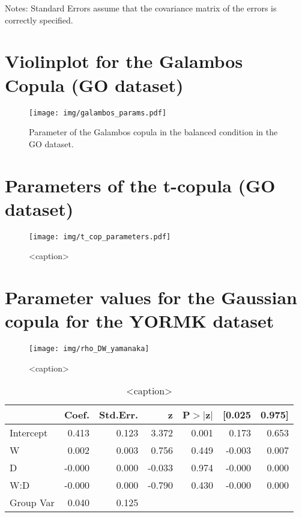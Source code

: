 \documentclass{article}
\begin{document}
Notes: \newline
[1] Standard Errors assume that the covariance matrix of the errors is correctly specified.


\section{Violinplot for the Galambos Copula (GO dataset)}
\begin{figure}[htbp]
    \centering
    \texttt{[image: img/galambos\_params.pdf]}
    \caption{Parameter of the Galambos copula in the balanced condition in the GO dataset.}
    \label{<label>}
\end{figure}

\section{Parameters of the t-copula (GO dataset)}
\begin{figure}[htbp]
    \centering
    \texttt{[image: img/t\_cop\_parameters.pdf]}
    \caption{<caption>}
    \label{<label>}
\end{figure}

\section{Parameter values for the Gaussian copula for the YORMK dataset}

\begin{figure}[htbp]
    \centering
    \texttt{[image: img/rho\_DW\_yamanaka]}
    \caption{<caption>}
    \label{fig:rho_DW}
\end{figure}

\begin{table}[htbp]
    \begin{center}
        \begin{tabular}{lrrrrrr}
        \hline
                  &  Coef. & Std.Err. &      z & P$> |$z$|$ & [0.025 & 0.975]  \\
        \hline
        Intercept &  0.413 &    0.123 &  3.372 &       0.001 &  0.173 &  0.653  \\
        W         &  0.002 &    0.003 &  0.756 &       0.449 & -0.003 &  0.007  \\
        D         & -0.000 &    0.000 & -0.033 &       0.974 & -0.000 &  0.000  \\
        W:D       & -0.000 &    0.000 & -0.790 &       0.430 & -0.000 &  0.000  \\
        Group Var &  0.040 &    0.125 &        &             &        &         \\
        \hline
        \end{tabular}
        \end{center}
        
    \caption{<caption>}
    \label{<label>}
\end{table}
\end{document}
